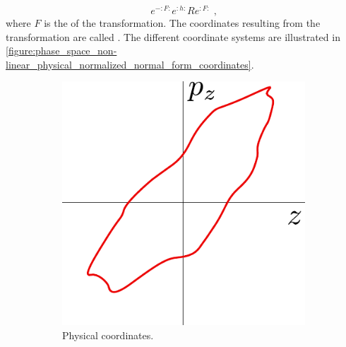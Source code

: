 \begin{equation}
    e^{-:F:} e^{:h:} R e^{:F:} \text{ ,}
    \label{equation:normal_form_transformation}
\end{equation}
where \(F\) is the  of the transformation.
The coordinates resulting from the transformation are called .
The different coordinate systems are illustrated in \cref{figure:phase_space_non-linear_physical_normalized_normal_form_coordinates}.

\begin{figure}[!hbt]
    \centering
    \begin{subfigure}[b]{0.30\textwidth}
        \centering
        \includegraphics[width=\textwidth]{Figures/Beam_Dynamics_Theory/phase_space_nonlinear_physical.pdf}
        \caption{Physical coordinates.}
        \label{fig:phase_space_physical_non-linear}
    \end{subfigure}
    \hfill
    \begin{subfigure}[b]{0.30\textwidth}
        \centering

\end{subfigure}
\end{figure}
